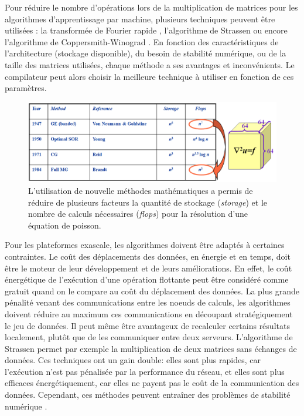             Pour réduire le nombre d’opérations lors de la multiplication de matrices pour les algorithmes d’apprentissage par machine, plusieurs techniques peuvent être utilisées \cite{Sze2017}: la transformée de Fourier rapide \cite{Vasilache2014}, l’algorithme de Strassen \cite{Cong2014} ou encore l'algorithme de Coppersmith-Winograd \cite{Li2016}. En fonction des caractéristiques de l’architecture (stockage disponible), du besoin de stabilité numérique, ou de la taille des matrices utilisées, chaque méthode a ses avantages et inconvénients. Le compilateur peut alors choisir la meilleure technique à utiliser en fonction de ces paramètres.
    
            \begin{figure}
            \center
            \includegraphics[width=14cm]{images/edl_new_algo.png}
            \caption{\label{fig:edl_new_algo} L'utilisation de nouvelle méthodes mathématiques a permis de réduire de plusieurs facteurs la quantité de stockage (\textit{storage}) et le nombre de calculs nécessaires (\textit{flops}) pour la résolution d'une équation de poisson\protect\footnotemark.}
            \end{figure}

            Pour les plateformes exascale, les algorithmes doivent être adaptés à certaines contraintes. Le coût des déplacements des données, en énergie et en temps, doit être le moteur de leur développement et de leurs améliorations. En effet, le coût énergétique de l'exécution d’une opération flottante peut être considéré comme gratuit quand on le compare au coût du déplacement des données. La plus grande pénalité venant des communications entre les noeuds de calculs, les algorithmes doivent réduire au maximum ces communications en découpant stratégiquement le jeu de données. Il peut même être avantageux de recalculer certains résultats localement, plutôt que de les communiquer entre deux serveurs. L'algorithme de Strassen \cite{Lipshitz2012} permet par exemple la multiplication de deux matrices sans échanges de données. Ces techniques ont un gain double: elles sont plus rapides, car l’exécution n’est pas pénalisée par la performance du réseau, et elles sont plus efficaces énergétiquement, car elles ne payent pas le coût de la communication des données. Cependant, ces méthodes peuvent entraîner des problèmes de stabilité numérique \cite{khabou2013dense}. 
                        

